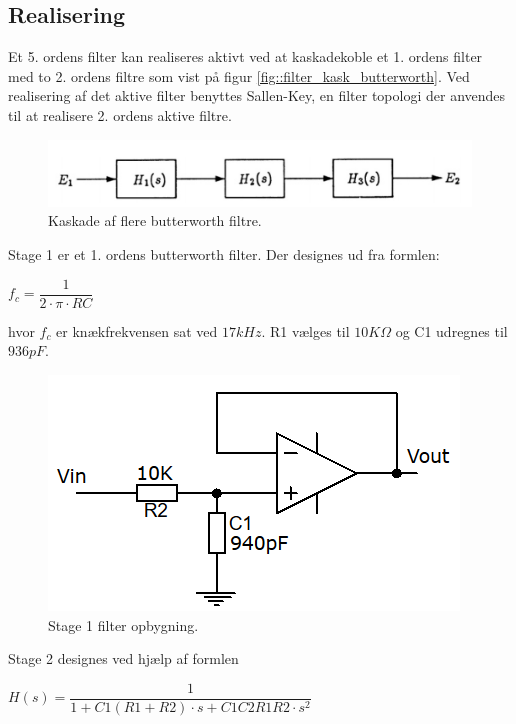 \subsection{Realisering}
Et 5. ordens filter kan realiseres aktivt ved at kaskadekoble et 1. ordens filter med to 2. ordens filtre som vist på figur  \ref{fig::filter_kask_butterworth}. Ved realisering af det aktive filter benyttes Sallen-Key, en filter topologi der anvendes til at realisere 2. ordens aktive filtre. 
\begin{figure}[h!]
	\centering
	\includegraphics[scale=0.7]{./billeder/kaskade.png}
	\caption{Kaskade af flere butterworth filtre.}
	\label{fig::kask_butterworth}
\end{figure}
\FloatBlock
Stage 1 er et 1. ordens butterworth filter. Der designes ud fra formlen:\\
\begin{center}
	$f_c = \dfrac{1}{2\cdot\pi\cdot R C}$\\
\end{center} 	
hvor $f_c$ er knækfrekvensen sat ved $17kHz$.
R1 vælges til $10K\Omega$ og C1 udregnes til $936pF$.\\
\begin{figure}[h!]
	\centering
	\includegraphics[scale=0.3]{./billeder/stage1.png}
	\caption{Stage 1 filter opbygning.}
	\label{fig::stage1}
\end{figure}
\FloatBlock
Stage 2 designes ved hjælp af formlen\\
\begin{center}
\begin{math}
H(s) = \dfrac{1}{1+C1(R1+R2)\cdot s+C1C2R1R2\cdot s^2}
\label{eq::SallenKey}
\end{math}
	
\end{center} 


